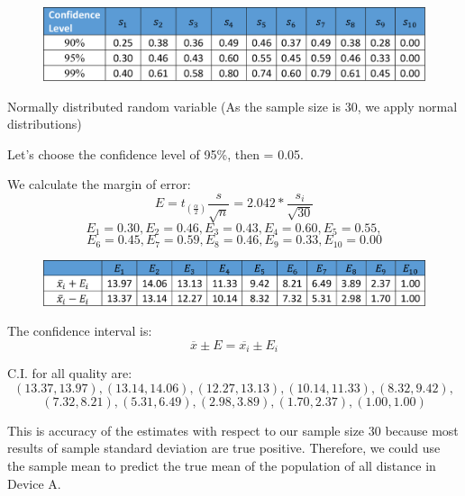 \documentclass[a4paper,12pt]{article}
\begin{document}
\begin{appendices}
\begin{figure}[h!]
\centering
\includegraphics[scale=.9]{StatisticalTest/Distance3.png}
\end{figure}

Normally distributed random variable (As the sample size is 30, we apply normal distributions)

Let’s choose the confidence level of 95\%, then  = 0.05.

We calculate the margin of error:
$$E=t_{(\frac{\alpha}{2})}  \frac{s}{\sqrt{n}}=2.042*\frac{s_i}{\sqrt{30}}$$
$$E_1=0.30,E_2=0.46,E_3=0.43,E_4=0.60,E_5=0.55,$$
$$E_6=0.45,E_7=0.59,E_8=0.46,E_9=0.33,E_10=0.00$$

\begin{figure}[h!]
\centering
\includegraphics[scale=.9]{StatisticalTest/Distance4.png}
\end{figure}

The confidence interval is:
$$\overline{x}\pm{E}=\overline{x_i}\pm{E}_i$$

C.I. for all quality are:
$$(13.37,13.97),(13.14,14.06),(12.27,13.13),(10.14,11.33),(8.32,9.42),$$
$$(7.32,8.21),(5.31,6.49),(2.98,3.89),(1.70,2.37),(1.00,1.00)$$

This is accuracy of the estimates with respect to our sample size 30 because most results of sample standard deviation are true positive. Therefore, we could use the sample mean to predict the true mean of the population of all distance in Device A.

\end{appendices}
\end{document}
